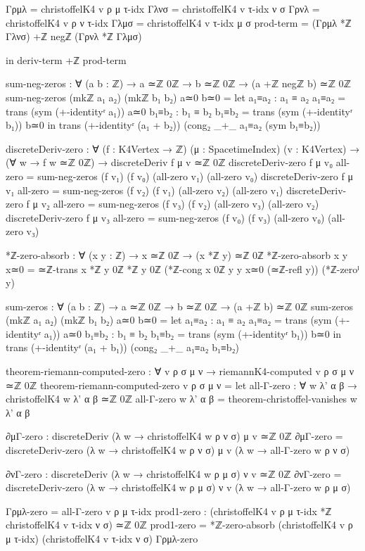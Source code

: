 \documentclass[11pt,a4paper]{book}
\begin{document}
\begin{code}
      Γρμλ = christoffelK4 v ρ μ τ-idx
      Γλνσ = christoffelK4 v τ-idx ν σ
      Γρνλ = christoffelK4 v ρ ν τ-idx
      Γλμσ = christoffelK4 v τ-idx μ σ
      prod-term = (Γρμλ *ℤ Γλνσ) +ℤ negℤ (Γρνλ *ℤ Γλμσ)
      
  in deriv-term +ℤ prod-term

sum-neg-zeros : ∀ (a b : ℤ) → a ≃ℤ 0ℤ → b ≃ℤ 0ℤ → (a +ℤ negℤ b) ≃ℤ 0ℤ
sum-neg-zeros (mkℤ a₁ a₂) (mkℤ b₁ b₂) a≃0 b≃0 = 
  let a₁≡a₂ : a₁ ≡ a₂
      a₁≡a₂ = trans (sym (+-identityʳ a₁)) a≃0
      b₁≡b₂ : b₁ ≡ b₂
      b₁≡b₂ = trans (sym (+-identityʳ b₁)) b≃0
  in trans (+-identityʳ (a₁ + b₂)) (cong₂ _+_ a₁≡a₂ (sym b₁≡b₂))

discreteDeriv-zero : ∀ (f : K4Vertex → ℤ) (μ : SpacetimeIndex) (v : K4Vertex) →
                     (∀ w → f w ≃ℤ 0ℤ) → discreteDeriv f μ v ≃ℤ 0ℤ
discreteDeriv-zero f μ v₀ all-zero = sum-neg-zeros (f v₁) (f v₀) (all-zero v₁) (all-zero v₀)
discreteDeriv-zero f μ v₁ all-zero = sum-neg-zeros (f v₂) (f v₁) (all-zero v₂) (all-zero v₁)
discreteDeriv-zero f μ v₂ all-zero = sum-neg-zeros (f v₃) (f v₂) (all-zero v₃) (all-zero v₂)
discreteDeriv-zero f μ v₃ all-zero = sum-neg-zeros (f v₀) (f v₃) (all-zero v₀) (all-zero v₃)

*ℤ-zero-absorb : ∀ (x y : ℤ) → x ≃ℤ 0ℤ → (x *ℤ y) ≃ℤ 0ℤ
*ℤ-zero-absorb x y x≃0 = 
  ≃ℤ-trans {x *ℤ y} {0ℤ *ℤ y} {0ℤ} (*ℤ-cong {x} {0ℤ} {y} {y} x≃0 (≃ℤ-refl y)) (*ℤ-zeroˡ y)

sum-zeros : ∀ (a b : ℤ) → a ≃ℤ 0ℤ → b ≃ℤ 0ℤ → (a +ℤ b) ≃ℤ 0ℤ
sum-zeros (mkℤ a₁ a₂) (mkℤ b₁ b₂) a≃0 b≃0 = 
  let a₁≡a₂ : a₁ ≡ a₂
      a₁≡a₂ = trans (sym (+-identityʳ a₁)) a≃0
      b₁≡b₂ : b₁ ≡ b₂
      b₁≡b₂ = trans (sym (+-identityʳ b₁)) b≃0
  in trans (+-identityʳ (a₁ + b₁)) (cong₂ _+_ a₁≡a₂ b₁≡b₂)

theorem-riemann-computed-zero : ∀ v ρ σ μ ν → riemannK4-computed v ρ σ μ ν ≃ℤ 0ℤ
theorem-riemann-computed-zero v ρ σ μ ν = 
  let
      all-Γ-zero : ∀ w λ' α β → christoffelK4 w λ' α β ≃ℤ 0ℤ
      all-Γ-zero w λ' α β = theorem-christoffel-vanishes w λ' α β
      
      ∂μΓ-zero : discreteDeriv (λ w → christoffelK4 w ρ ν σ) μ v ≃ℤ 0ℤ
      ∂μΓ-zero = discreteDeriv-zero (λ w → christoffelK4 w ρ ν σ) μ v 
                   (λ w → all-Γ-zero w ρ ν σ)
      
      ∂νΓ-zero : discreteDeriv (λ w → christoffelK4 w ρ μ σ) ν v ≃ℤ 0ℤ
      ∂νΓ-zero = discreteDeriv-zero (λ w → christoffelK4 w ρ μ σ) ν v
                   (λ w → all-Γ-zero w ρ μ σ)
      
      Γρμλ-zero = all-Γ-zero v ρ μ τ-idx
      prod1-zero : (christoffelK4 v ρ μ τ-idx *ℤ christoffelK4 v τ-idx ν σ) ≃ℤ 0ℤ
      prod1-zero = *ℤ-zero-absorb (christoffelK4 v ρ μ τ-idx) 
                                   (christoffelK4 v τ-idx ν σ) Γρμλ-zero
      

\end{code}
\end{document}
